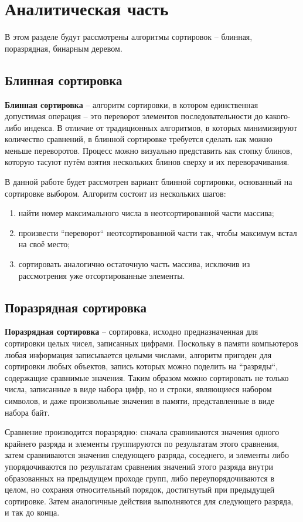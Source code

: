 \chapter{Аналитическая часть}
В этом разделе будут рассмотрены алгоритмы сортировок -- блинная, поразрядная, бинарным деревом.

\section{Блинная сортировка}
\textbf{Блинная сортировка} \cite{pancake-sort}  -- алгоритм сортировки, в котором единственная допустимая операция -- это переворот элементов последовательности до какого-либо индекса. В отличие от традиционных алгоритмов, в которых минимизируют количество сравнений, в блинной сортировке требуется сделать как можно меньше переворотов. Процесс можно визуально представить как стопку блинов, которую тасуют путём взятия нескольких блинов сверху и их переворачивания.

В данной работе будет рассмотрен вариант блинной сортировки, основанный на сортировке выбором.
Алгоритм состоит из нескольких шагов:
\begin{enumerate}[label=\arabic*)]
	\item найти номер максимального числа в неотсортированной части массива;
	\item произвести ``переворот`` неотсортированной части так, чтобы максимум встал на своё место;
	\item сортировать аналогично остаточную часть массива, исключив из рассмотрения уже отсортированные элементы.
\end{enumerate}

\section{Поразрядная сортировка}
\textbf{Поразрядная сортировка} \cite{radix-sort}  -- сортировка, исходно предназначенная для сортировки целых чисел, записанных цифрами. 
Поскольку в памяти компьютеров любая информация записывается целыми числами, алгоритм пригоден для сортировки любых объектов, запись которых можно поделить на ``разряды``, содержащие сравнимые значения. 
Таким образом можно сортировать не только числа, записанные в виде набора цифр, но и строки, являющиеся набором символов, и даже произвольные значения в памяти, представленные в виде набора байт.


Сравнение производится поразрядно: сначала сравниваются значения одного крайнего разряда и элементы группируются по результатам этого сравнения, затем сравниваются значения следующего разряда, соседнего, и элементы либо упорядочиваются по результатам сравнения значений этого разряда внутри образованных на предыдущем проходе групп, либо переупорядочиваются в целом, но сохраняя относительный порядок, достигнутый при предыдущей сортировке. Затем аналогичные действия выполняются для следующего разряда, и так до конца.


